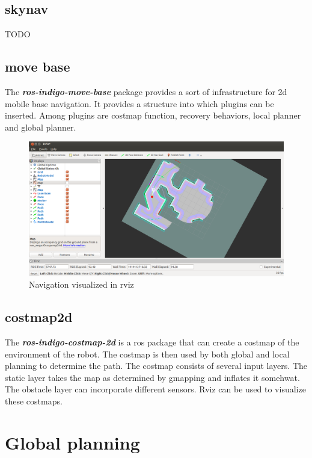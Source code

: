 \documentclass[a4paper]{article}
\newcommand{\rospackage}[1]{\textbf{\textit{#1}}}
\begin{document}
\subsection{skynav}
TODO

\subsection{move base}

The \rospackage{ros-indigo-move-base} package provides a sort of infrastructure for 2d mobile base
navigation. It provides a structure into which plugins can be inserted.
Among plugins are costmap function, recovery behaviors, local planner and global planner.

\begin{figure}[h!]
  \includegraphics[width=\textwidth,height=\textheight,keepaspectratio]{img/rviz_navigation2.png}
  \caption{Navigation visualized in rviz}
  \label{fig:navrviz}
\end{figure}

\subsection{costmap2d}
The \rospackage{ros-indigo-costmap-2d} is a ros package that can create a costmap of the environment
of the robot.
The costmap is then used by both global and local planning to determine the path.
The costmap consists of several input layers. The static layer takes the map as determined by
gmapping and inflates it somehwat. The obstacle layer can incorporate different sensors.
Rviz can be used to visualize these costmaps.

\section{Global planning}
\end{document}
